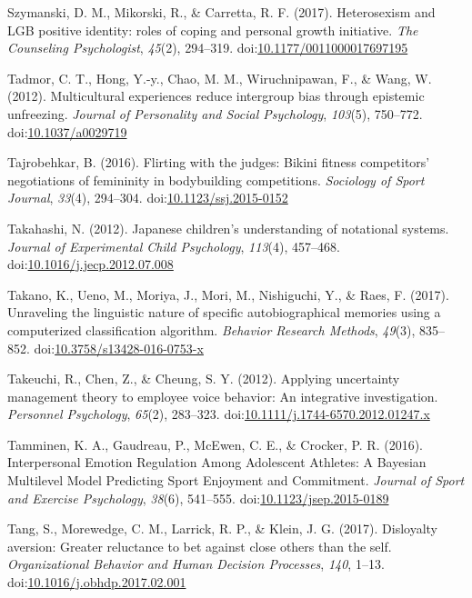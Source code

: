 \documentclass[english,man]{apa6}
\theoremstyle{definition}
\theoremstyle{definition}
\theoremstyle{definition}
\theoremstyle{remark}
\begin{document}
\hypertarget{ref-Szymanski2017}{}
Szymanski, D. M., Mikorski, R., \& Carretta, R. F. (2017). Heterosexism
and LGB positive identity: roles of coping and personal growth
initiative. \emph{The Counseling Psychologist}, \emph{45}(2), 294--319.
doi:\href{https://doi.org/10.1177/0011000017697195}{10.1177/0011000017697195}

\hypertarget{ref-Tadmor2012}{}
Tadmor, C. T., Hong, Y.-y., Chao, M. M., Wiruchnipawan, F., \& Wang, W.
(2012). Multicultural experiences reduce intergroup bias through
epistemic unfreezing. \emph{Journal of Personality and Social
Psychology}, \emph{103}(5), 750--772.
doi:\href{https://doi.org/10.1037/a0029719}{10.1037/a0029719}

\hypertarget{ref-Tajrobehkar2016}{}
Tajrobehkar, B. (2016). Flirting with the judges: Bikini fitness
competitors' negotiations of femininity in bodybuilding competitions.
\emph{Sociology of Sport Journal}, \emph{33}(4), 294--304.
doi:\href{https://doi.org/10.1123/ssj.2015-0152}{10.1123/ssj.2015-0152}

\hypertarget{ref-Takahashi2012}{}
Takahashi, N. (2012). Japanese children's understanding of notational
systems. \emph{Journal of Experimental Child Psychology}, \emph{113}(4),
457--468.
doi:\href{https://doi.org/10.1016/j.jecp.2012.07.008}{10.1016/j.jecp.2012.07.008}

\hypertarget{ref-Takano2017}{}
Takano, K., Ueno, M., Moriya, J., Mori, M., Nishiguchi, Y., \& Raes, F.
(2017). Unraveling the linguistic nature of specific autobiographical
memories using a computerized classification algorithm. \emph{Behavior
Research Methods}, \emph{49}(3), 835--852.
doi:\href{https://doi.org/10.3758/s13428-016-0753-x}{10.3758/s13428-016-0753-x}

\hypertarget{ref-Takeuchi2012}{}
Takeuchi, R., Chen, Z., \& Cheung, S. Y. (2012). Applying uncertainty
management theory to employee voice behavior: An integrative
investigation. \emph{Personnel Psychology}, \emph{65}(2), 283--323.
doi:\href{https://doi.org/10.1111/j.1744-6570.2012.01247.x}{10.1111/j.1744-6570.2012.01247.x}

\hypertarget{ref-Tamminen2016}{}
Tamminen, K. A., Gaudreau, P., McEwen, C. E., \& Crocker, P. R. (2016).
Interpersonal Emotion Regulation Among Adolescent Athletes: A Bayesian
Multilevel Model Predicting Sport Enjoyment and Commitment.
\emph{Journal of Sport and Exercise Psychology}, \emph{38}(6), 541--555.
doi:\href{https://doi.org/10.1123/jsep.2015-0189}{10.1123/jsep.2015-0189}

\hypertarget{ref-Tang2017}{}
Tang, S., Morewedge, C. M., Larrick, R. P., \& Klein, J. G. (2017).
Disloyalty aversion: Greater reluctance to bet against close others than
the self. \emph{Organizational Behavior and Human Decision Processes},
\emph{140}, 1--13.
doi:\href{https://doi.org/10.1016/j.obhdp.2017.02.001}{10.1016/j.obhdp.2017.02.001}
\end{document}
